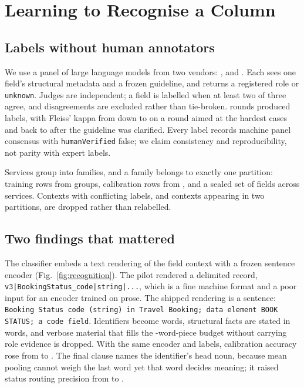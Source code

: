 \documentclass[conference]{IEEEtran}
\newcommand{\code}[1]{\texttt{#1}}
\begin{document}
\section{Learning to Recognise a Column}
\label{sec:learning}

\subsection{Labels without human annotators}

We use a panel of \LabelJudges{} large language models from two vendors:
\JudgeOne{}, \JudgeTwo{} and \JudgeThree{}. Each sees one field's
structural metadata and a frozen guideline, and returns a registered
role or \code{unknown}. Judges are independent; a field is labelled when
at least two of three agree, and disagreements are excluded rather than
tie-broken. \LabelRounds{} rounds produced \LabelFields{} labels, with
Fleiss' kappa from \KappaHigh{} down to \KappaLow{} on a round aimed at
the hardest cases and back to \KappaFinal{} after the guideline was
clarified. Every label records machine panel consensus with
\code{humanVerified} false; we claim consistency and reproducibility,
not parity with expert labels.

Services group into families, and a family belongs to exactly one
partition: \TrainRows{} training rows from \TrainGroups{} groups,
\CalibrationRows{} calibration rows from \CalibrationGroups{}, and a
sealed set of \SealedRows{} fields across \SealedServices{} services.
Contexts with conflicting labels, and contexts appearing in two
partitions, are dropped rather than relabelled.

\subsection{Two findings that mattered}

The classifier embeds a text rendering of the field context with a
frozen sentence encoder (Fig.~\ref{fig:recognition}). The pilot rendered
a delimited record, \code{v3|BookingStatus\_code|string|...}, which is a
fine machine format and a poor input for an encoder trained on prose.
The shipped rendering is a sentence: \code{Booking Status code (string)
in Travel Booking; data element BOOK STATUS; a code field}. Identifiers
become words, structural facts are stated in words, and verbose material
that fills the \TokenBudget{}-word-piece budget without carrying role
evidence is dropped. With the same encoder and labels, calibration
accuracy rose from \DelimitedAccuracy{} to \SentenceAccuracy{}. The
final clause names the identifier's head noun, because mean pooling
cannot weigh the last word yet that word decides meaning; it raised
status routing precision from \HeadNounPrecisionBefore{} to
\HeadNounPrecisionAfter{}.
\end{document}
